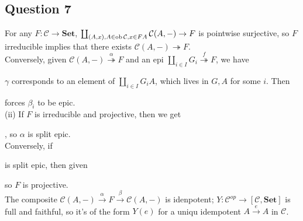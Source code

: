 \documentclass[a4paper]{article}
\begin{document}
\subsection{Question 7}
For any $F: \mathcal{C} \to \mathbf{Set}$, $\coprod_{(A,x), A \in \operatorname{ob}\mathcal{C},x \in FA} \mathcal{C}(A,-) \to F$ is pointwise surjective, so $F$ irreducible implies that there exists $\mathcal{C}(A,-) \twoheadrightarrow F$.\\
Conversely, given $\mathcal{C}(A,-) \stackrel{\alpha}{\twoheadrightarrow} F$ and an epi $\coprod_{i \in I} G_i \stackrel{f}{\twoheadrightarrow} F$, we have 
$\gamma$ corresponds to an element of $\coprod_{i \in I} G_i A$, which lives in $G,A$ for some $i$. Then 
forces $\beta_i$ to be epic.\\
(ii) If $F$ is irreducible and projective, then we get
, so $\alpha$ is split epic.\\
Conversely, if
is split epic, then given
so $F$ is projective.\\
The composite $\mathcal{C}(A,-) \xrightarrow{\alpha} F \xrightarrow{\beta} \mathcal{C}(A,-)$ is idenpotent; $Y:\mathcal{C}^{op} \to [\mathcal{C},\mathbf{Set}]$ is full and faithful, so it's of the form $Y(e)$ for a uniqu idempotent $A \xrightarrow{e} A$ in $\mathcal{C}$.\\
\end{document}
